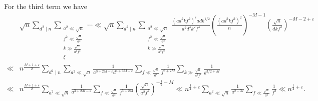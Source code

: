 \documentclass[10pt,oneside,reqno]{amsart}
\makeatletter
\theoremstyle{THEOREM}
\theoremstyle{DEFINITION}
\theoremstyle{EXERCISE}
\numberwithin{equation}{section}
\renewenvironment{proof}[1][\proofname]{\par
  \vspace{-6pt}
  \pushQED{\qed}
  \normalfont \topsep6\p@\@plus6\p@\relax
  \trivlist
  \item[\hskip\labelsep\rmfamily\bfseries
    #1\@addpunct{:}]\ignorespaces
}{
  \popQED\endtrivlist\@endpefalse
  \vspace{-6pt}
}
\makeatother
\begin{document}
\begin{proof}
For the third term we have
\begin{align*}
&\sqrt{n}\sum_{d^2\mid n}\sum_{\substack{a^2\ll \sqrt {n}\\ f^2\ll \frac{\sqrt{n}}{a^2}\\k\gg \frac{\sqrt{n}}{a^2f^2}\\\xi}}\cdots
\ll\sqrt{n} \sum_{d^2\mid n}\sum_{\substack{a^2\ll \sqrt {n}\\ f^2\ll \frac{\sqrt{n}}{a^2}\\k\gg \frac{\sqrt{n}}{a^2f^2}}}\frac{(ad^2kf^2)^\varepsilon adk^{1/2}}{a^2d^3k^2f^3} \left(\frac{(ad^2kf^2)^2}{n} \right)^{-M-1}\left(\frac{\sqrt{n}}{dkf^2}\right)^{-M-2+\varepsilon}\\
\ll &n^{\frac{M+1+\varepsilon}{2}}\sum_{d^2\mid n}\sum_{a^2\ll \sqrt{n}}\frac{1}{ a^{3+2M-\varepsilon}d^{4+3M-\varepsilon}}\sum_{f\ll \frac{\sqrt{n}}{a^2}}\frac{1}{f^{3+2M}}\sum_{k\gg \frac{\sqrt{n}}{a^2f^2}}\frac{1}{k^{3/2+M}}\\
\ll &n^{\frac{M+1+\varepsilon}{2}}\sum_{a^2\ll \sqrt{n}}\frac{1}{a^{3+2M-\varepsilon}}\sum_{f\ll \frac{\sqrt{n}}{a^2}}\frac{1}{f^{3+2M}} \left(\frac{\sqrt{n}}{a^2f^2}\right)^{-\frac12-M}\ll n^{\frac14+\varepsilon}\sum_{a^2\ll \sqrt{n}}\frac{1}{a^{2-3\varepsilon}}\sum_{f\ll \frac{\sqrt{n}}{a^2}}\frac{1}{f^{2}}\ll n^{\frac14+\varepsilon}.
\end{align*}


\end{proof}
\end{document}

